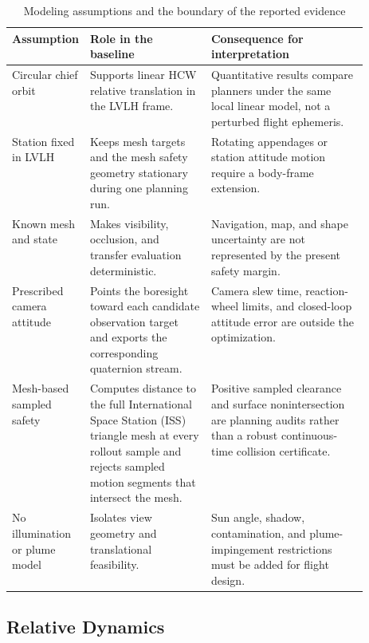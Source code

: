 \documentclass{IEEEtaes}
\theoremstyle{remark}
\theoremstyle{plain}
\begin{document}
\begin{table}[t]
  \centering
  \caption{Modeling assumptions and the boundary of the reported evidence}
  \label{tab:assumptions}
  \renewcommand{\arraystretch}{1.08}
  \setlength{\tabcolsep}{5pt}
  \footnotesize
  \begin{tabularx}{\linewidth}{@{}p{0.18\linewidth}p{0.34\linewidth}X@{}}
    \toprule
    Assumption & Role in the baseline & Consequence for interpretation \\
    \midrule
    Circular chief orbit & Supports linear HCW relative translation in the LVLH frame. & Quantitative results compare planners under the same local linear model, not a perturbed flight ephemeris. \\
    Station fixed in LVLH & Keeps mesh targets and the mesh safety geometry stationary during one planning run. & Rotating appendages or station attitude motion require a body-frame extension. \\
    Known mesh and state & Makes visibility, occlusion, and transfer evaluation deterministic. & Navigation, map, and shape uncertainty are not represented by the present safety margin. \\
    Prescribed camera attitude & Points the boresight toward each candidate observation target and exports the corresponding quaternion stream. & Camera slew time, reaction-wheel limits, and closed-loop attitude error are outside the optimization. \\
    Mesh-based sampled safety & Computes distance to the full International Space Station (ISS) triangle mesh at every rollout sample and rejects sampled motion segments that intersect the mesh. & Positive sampled clearance and surface nonintersection are planning audits rather than a robust continuous-time collision certificate. \\
    No illumination or plume model & Isolates view geometry and translational feasibility. & Sun angle, shadow, contamination, and plume-impingement restrictions must be added for flight design. \\
    \bottomrule
  \end{tabularx}
\end{table}

\subsection{Relative Dynamics}
\end{document}
